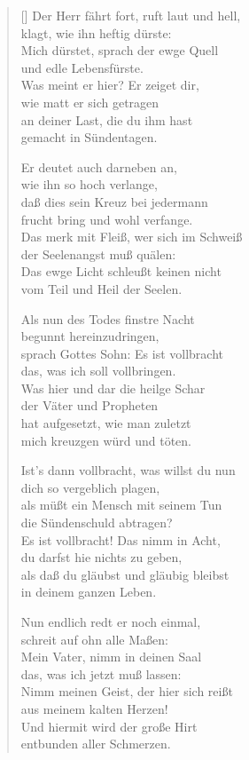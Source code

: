 \begin{multicols}{2}
\begin{verse}[\versewidth]
 Der Herr fährt fort, ruft laut und hell,\\
klagt, wie ihn heftig dürste:\\
Mich dürstet, sprach der ewge Quell\\
und edle Lebensfürste.\\
Was meint er hier? Er zeiget dir,\\
wie matt er sich getragen\\
an deiner Last, die du ihm hast\\
gemacht in Sündentagen.

 Er deutet auch darneben an,\\
wie ihn so hoch verlange,\\
daß dies sein Kreuz bei jedermann\\
frucht bring und wohl verfange.\\
Das merk mit Fleiß, wer sich im Schweiß\\
der Seelenangst muß quälen:\\
Das ewge Licht schleußt keinen nicht\\
vom Teil und Heil der Seelen.

 Als nun des Todes finstre Nacht\\
begunnt hereinzudringen,\\
sprach Gottes Sohn: Es ist vollbracht\\
das, was ich soll vollbringen.\\
Was hier und dar die heilge Schar\\
der Väter und Propheten\\
hat aufgesetzt, wie man zuletzt\\
mich kreuzgen würd und töten.

\vfill\null
\columnbreak

 Ist's dann vollbracht, was willst du nun\\
dich so vergeblich plagen,\\
als müßt ein Mensch mit seinem Tun\\
die Sündenschuld abtragen?\\
Es ist vollbracht! Das nimm in Acht,\\
du darfst hie nichts zu geben,\\
als daß du gläubst und gläubig bleibst\\
in deinem ganzen Leben.

 Nun endlich redt er noch einmal,\\
schreit auf ohn alle Maßen:\\
Mein Vater, nimm in deinen Saal\\
das, was ich jetzt muß lassen:\\
Nimm meinen Geist, der hier sich reißt\\
aus meinem kalten Herzen!\\
Und hiermit wird der große Hirt\\
entbunden aller Schmerzen.

\end{verse}
\end{multicols}


